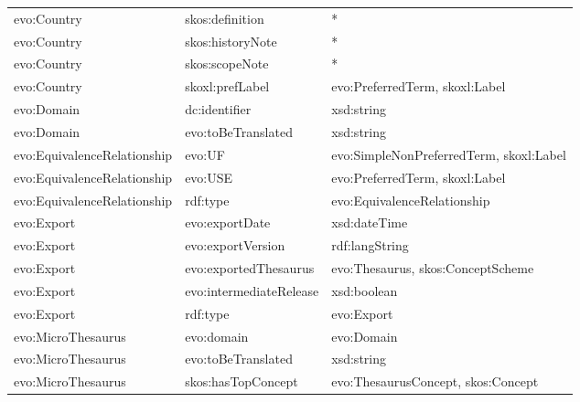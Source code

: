 \documentclass[10pt,a4paper,titlepage,final]{article}
\begin{document}
\begin{tabularx}{\textwidth}{llX}
                  evo:Country &               skos:definition &                                                  * \\
                  evo:Country &              skos:historyNote &                                                  * \\
                  evo:Country &                skos:scopeNote &                                                  * \\
                  evo:Country &               skoxl:prefLabel &                     evo:PreferredTerm, skoxl:Label \\
                   evo:Domain &                 dc:identifier &                                         xsd:string \\
                   evo:Domain &            evo:toBeTranslated &                                         xsd:string \\
  evo:EquivalenceRelationship &                        evo:UF &            evo:SimpleNonPreferredTerm, skoxl:Label \\
  evo:EquivalenceRelationship &                       evo:USE &                     evo:PreferredTerm, skoxl:Label \\
  evo:EquivalenceRelationship &                      rdf:type &                        evo:EquivalenceRelationship \\
                   evo:Export &                evo:exportDate &                                       xsd:dateTime \\
                   evo:Export &             evo:exportVersion &                                     rdf:langString \\
                   evo:Export &         evo:exportedThesaurus &                  evo:Thesaurus, skos:ConceptScheme \\
                   evo:Export &       evo:intermediateRelease &                                        xsd:boolean \\
                   evo:Export &                      rdf:type &                                         evo:Export \\
           evo:MicroThesaurus &                    evo:domain &                                         evo:Domain \\
           evo:MicroThesaurus &            evo:toBeTranslated &                                         xsd:string \\
           evo:MicroThesaurus &            skos:hasTopConcept &                 evo:ThesaurusConcept, skos:Concept \\

\end{tabularx}
\end{document}
